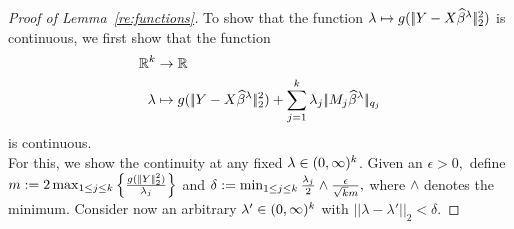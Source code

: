 \documentclass[bj]{imsart}
\newcommand{\normtwo}[1]{\ensuremath{\!|\!| #1 | \! |_{2}}}
\newcommand{\normqj}[1]{\ensuremath{\!|\!| #1 | \! |_{q_j}}}
\newcommand{\1}{{\rm 1}\mskip -4,5mu{\rm l} }
\def\R{\mathbb{R}}
\begin{document}
\begin{proof}[Proof of Lemma~\ref{re:functions}]                  

To show that the function $\lambda\mapsto g(\,\normtwo{\outcome-\design\estimatort}^{2})$ is continuous, we first show that the function 
\begin{align*}
\R^\numbergroups &\to \R \\
\lambda &\mapsto g(\,\normtwo{\outcome-\design\estimatort}^{2})+\sum_{j=1}^\numbergroups\lambda_j\,\normqj{\fusedmatrix_j\estimatort}
\end{align*} 
is continuous.\\
For this, we show the continuity at any  fixed  $\lambda\in(0,\infty)^{k}$. Given an $\epsilon>0,$ define  $m:=2\max_{1\le j\le \numbergroups}\left\{\frac{g(\,\normtwo{\outcome}^2)}{\lambda_j}\right\}$ and $\delta:= \min_{1\le j\le k}\frac{\lambda_j}{2}\wedge \frac{\epsilon}{\sqrt{k}m},$ where $\wedge$ denotes the minimum. Consider now an arbitrary $\lambda'\in(0,\infty)^{k}$ with $\normtwo{\lambda-\lambda'} < \delta.$ 


\end{proof}
\end{document}
